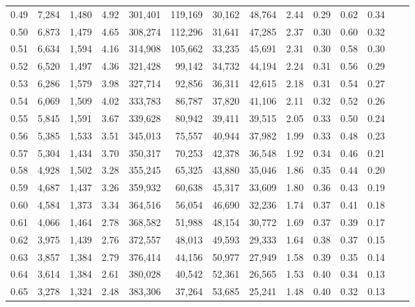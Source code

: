 \begin{tabular}{rrrrrrrrrrrrrr}
0.49 &  7,284 &  1,480 &    4.92 &  301,401 &  119,169 &  30,162 &  48,764 &  2.44 &  0.29 &  0.62 &      0.34 \\
0.50 &  6,873 &  1,479 &    4.65 &  308,274 &  112,296 &  31,641 &  47,285 &  2.37 &  0.30 &  0.60 &      0.32 \\
0.51 &  6,634 &  1,594 &    4.16 &  314,908 &  105,662 &  33,235 &  45,691 &  2.31 &  0.30 &  0.58 &      0.30 \\
0.52 &  6,520 &  1,497 &    4.36 &  321,428 &   99,142 &  34,732 &  44,194 &  2.24 &  0.31 &  0.56 &      0.29 \\
0.53 &  6,286 &  1,579 &    3.98 &  327,714 &   92,856 &  36,311 &  42,615 &  2.18 &  0.31 &  0.54 &      0.27 \\
0.54 &  6,069 &  1,509 &    4.02 &  333,783 &   86,787 &  37,820 &  41,106 &  2.11 &  0.32 &  0.52 &      0.26 \\
0.55 &  5,845 &  1,591 &    3.67 &  339,628 &   80,942 &  39,411 &  39,515 &  2.05 &  0.33 &  0.50 &      0.24 \\
0.56 &  5,385 &  1,533 &    3.51 &  345,013 &   75,557 &  40,944 &  37,982 &  1.99 &  0.33 &  0.48 &      0.23 \\
0.57 &  5,304 &  1,434 &    3.70 &  350,317 &   70,253 &  42,378 &  36,548 &  1.92 &  0.34 &  0.46 &      0.21 \\
0.58 &  4,928 &  1,502 &    3.28 &  355,245 &   65,325 &  43,880 &  35,046 &  1.86 &  0.35 &  0.44 &      0.20 \\
0.59 &  4,687 &  1,437 &    3.26 &  359,932 &   60,638 &  45,317 &  33,609 &  1.80 &  0.36 &  0.43 &      0.19 \\
0.60 &  4,584 &  1,373 &    3.34 &  364,516 &   56,054 &  46,690 &  32,236 &  1.74 &  0.37 &  0.41 &      0.18 \\
0.61 &  4,066 &  1,464 &    2.78 &  368,582 &   51,988 &  48,154 &  30,772 &  1.69 &  0.37 &  0.39 &      0.17 \\
0.62 &  3,975 &  1,439 &    2.76 &  372,557 &   48,013 &  49,593 &  29,333 &  1.64 &  0.38 &  0.37 &      0.15 \\
0.63 &  3,857 &  1,384 &    2.79 &  376,414 &   44,156 &  50,977 &  27,949 &  1.58 &  0.39 &  0.35 &      0.14 \\
0.64 &  3,614 &  1,384 &    2.61 &  380,028 &   40,542 &  52,361 &  26,565 &  1.53 &  0.40 &  0.34 &      0.13 \\
0.65 &  3,278 &  1,324 &    2.48 &  383,306 &   37,264 &  53,685 &  25,241 &  1.48 &  0.40 &  0.32 &      0.13 \\

\end{tabular}
